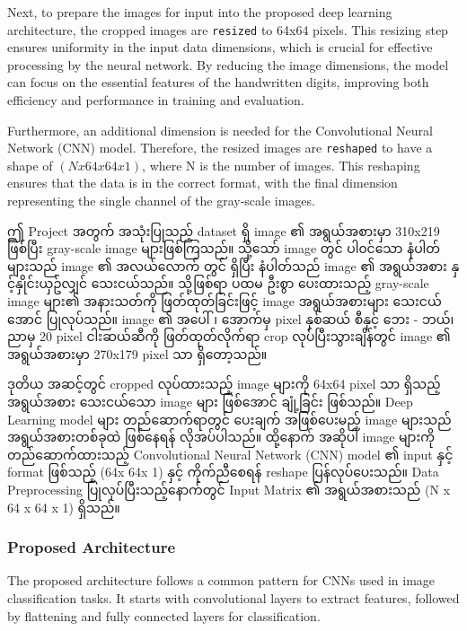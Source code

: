Next, to prepare the images for input into the proposed deep learning architecture, the cropped images are \texttt{resized} to 64x64 pixels. This resizing step ensures uniformity in the input data dimensions, which is crucial for effective processing by the neural network. By reducing the image dimensions, the model can focus on the essential features of the handwritten digits, improving both efficiency and performance in training and evaluation.

Furthermore, an additional dimension is needed for the Convolutional Neural Network (CNN) model. Therefore, the resized images are \texttt{reshaped} to have a shape of $(Nx 64x 64x 1)$, where N is the number of images. This reshaping ensures that the data is in the correct format, with the final dimension representing the single channel of the gray-scale images.

ဤ Project အတွက် အသုံးပြုသည့် dataset ရှိ  image ၏ အရွယ်အစားမှာ 310x219 ဖြစ်ပြီး gray-scale image များဖြစ်ကြသည်။ သို့သော် image တွင် ပါ၀င်သော နံပါတ်များသည် image ၏ အလယ်လောက် တွင် ရှိပြီး နံပါတ်သည် image ၏ အရွယ်အစား နှင့်နှိုင်းယှဥ်လျှင် သေးငယ်သည်။ သို့ဖြစ်ရာ ပထမ ဦးစွာ ပေးထားသည့် gray-scale image များ၏ အနားသတ်ကို ဖြတ်ထုတ်ခြင်းဖြင့် image အရွယ်အစားများ သေးငယ်အောင် ပြုလုပ်သည်။ image ၏ အပေါ် ၊ အောက်မှ pixel နှစ်ဆယ် စီနှင့် ဘေး - ဘယ်၊ ညာမှ 20 pixel ငါးဆယ်ဆီကို ဖြတ်ထုတ်လိုက်ရာ crop လုပ်ပြီးသွားချိန်တွင် image ၏ အရွယ်အစားမှာ 270x179 pixel သာ ရှိတော့သည်။ 

ဒုတိယ အဆင့်တွင် cropped လုပ်ထားသည့် image များကို 64x64 pixel သာ ရှိသည့် အရွယ်အစား သေးငယ်သော image များ ဖြစ်အောင် ချုံ့ခြင်း ဖြစ်သည်။ Deep Learning model များ တည်ဆောက်ရာတွင် ပေးချက် အဖြစ်ပေးမည့် image များသည် အရွယ်အစားတစ်ခုထဲ ဖြစ်နေရန် လိုအပ်ပါသည်။ ထို့နောက် အဆိုပါ image များကို တည်ဆောက်ထားသည့် Convolutional Neural Network (CNN) model ၏ input နှင့် format ဖြစ်သည့် (64x 64x 1) နှင့် ကိုက်ညီစေရန် reshape ပြန်လုပ်ပေးသည်။ Data Preprocessing ပြုလုပ်ပြီးသည့်နောက်တွင် Input Matrix ၏ အရွယ်အစားသည် (N x 64 x 64 x 1) ရှိသည်။ 

\subsubsection{Proposed Architecture}
The proposed architecture follows a common pattern for CNNs used in image classification tasks. It starts with convolutional layers to extract features, followed by flattening and fully connected layers for classification.

